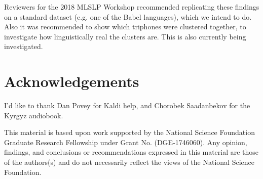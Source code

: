 \documentclass[a4paper]{article}
\begin{document}
Reviewers for the 2018 MLSLP Workshop recommended replicating these findings on a standard dataset (e.g. one of the Babel languages), which we intend to do. Also it was recommended to show which triphones were clustered together, to investigate how linguistically real the clusters are. This is also currently being investigated. 




\section{Acknowledgements}

I'd like to thank Dan Povey for Kaldi help, and Chorobek Saadanbekov for the Kyrgyz audiobook.

This material is based upon work supported by the National Science Foundation Graduate Research Fellowship under Grant No. (DGE-1746060). Any opinion, findings, and conclusions or recommendations expressed in this material are those of the authors(s) and do not necessarily reflect the views of the National Science Foundation.





\newpage



\end{document}
